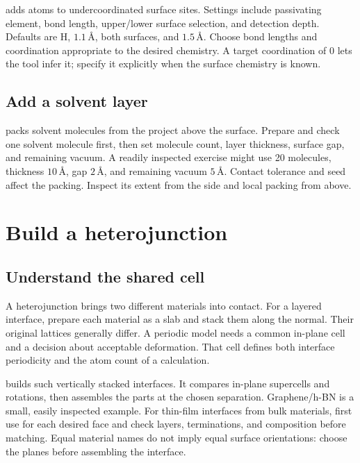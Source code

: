  adds atoms to undercoordinated surface sites. Settings include passivating element, bond length, upper/lower surface selection, and detection depth. Defaults are H, $1.1\,\text{\AA}$, both surfaces, and $1.5\,\text{\AA}$. Choose bond lengths and coordination appropriate to the desired chemistry. A target coordination of 0 lets the tool infer it; specify it explicitly when the surface chemistry is known.

\subsection{Add a solvent layer}

 packs solvent molecules from the project above the surface. Prepare and check one solvent molecule first, then set molecule count, layer thickness, surface gap, and remaining vacuum. A readily inspected exercise might use 20 molecules, thickness $10\,\text{\AA}$, gap $2\,\text{\AA}$, and remaining vacuum $5\,\text{\AA}$. Contact tolerance and seed affect the packing. Inspect its extent from the side and local packing from above.

\section{Build a heterojunction}\label{sec:heterojunction}

\subsection{Understand the shared cell}

A heterojunction brings two different materials into contact. For a layered interface, prepare each material as a slab and stack them along the normal. Their original lattices generally differ. A periodic model needs a common in-plane cell and a decision about acceptable deformation. That cell defines both interface periodicity and the atom count of a calculation.

 builds such vertically stacked interfaces. It compares in-plane supercells and rotations, then assembles the parts at the chosen separation. Graphene/h-BN is a small, easily inspected example. For thin-film interfaces from bulk materials, first use  for each desired face and check layers, terminations, and composition before matching. Equal material names do not imply equal surface orientations: choose the planes before assembling the interface.

